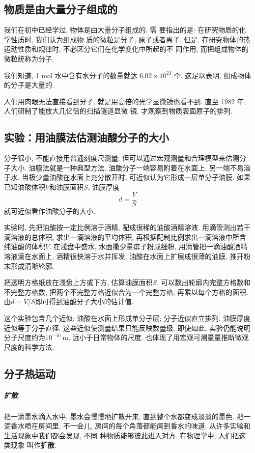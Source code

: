 \documentclass[11pt,a4paper]{ctexbook}
\newcommand{\unit}[1]{\ \mathrm{#1}}
\begin{document}
\subsection*{物质是由大量分子组成的}

我们在初中已经学过, 物体是由大量分子组成的. 需
要指出的是: 在研究物质的化学性质时, 我们认为组成物
质的微粒是分子, 原子或者离子. 但是, 在研究物体的热
运动性质和规律时, 不必区分它们在化学变化中所起的不
同作用, 而把组成物体的微粒统称为分子.

我们知道, 1 mol 水中含有水分子的数量就达 $6.02\times10^{23}$
个. 这足以表明, 组成物体的分子是大量的.

人们用肉眼无法直接看到分子, 就是用高倍的光学显微镜也看不到.
直至 1982 年, 人们研制了能放大几亿倍的扫描隧道显微
镜, 才观察到物质表面原子的排列.


\subsection*{实验：用油膜法估测油酸分子的大小}

分子很小, 不能直接用普通刻度尺测量. 但可以通过宏观测量和合理模型来估测分子大小.
油膜法就是一种典型方法. 油酸分子一端容易附着在水面上, 另一端不易溶于水. 当极少量油酸在水面上充分散开时,
可近似认为它形成一层单分子油膜. 如果已知油酸体积$V$和油膜面积$S$, 油膜厚度
$$d=\frac{V}{S}$$
就可近似看作油酸分子的大小.

实验时, 先把油酸按一定比例溶于酒精, 配成很稀的油酸酒精溶液. 用滴管测出若干滴溶液的总体积,
求出一滴溶液的平均体积, 再根据配制比例求出一滴溶液中所含纯油酸的体积$V$.
在浅盘中盛水, 水面撒少量痱子粉或细粉, 用滴管把一滴油酸酒精溶液滴在水面上. 酒精很快溶于水并挥发,
油酸在水面上扩展成很薄的油膜, 推开粉末形成清晰轮廓.

把透明方格纸放在浅盘上方或下方, 估算油膜面积$S$. 可以数出轮廓内完整方格数和不完整方格数,
把两个不完整方格近似合为一个完整方格, 再乘以每个方格的面积. 由$d=V/S$即可得到油酸分子大小的估计值.

这个实验包含几个近似: 油酸在水面上形成单分子层; 分子近似直立排列; 油膜厚度近似等于分子直径.
这些近似使测量结果只能反映数量级. 即使如此, 实验仍能说明分子尺度约为$10^{-10}\unit{m}$,
远小于日常物体的尺度, 也体现了用宏观可测量量推断微观尺度的科学方法.
\subsection*{分子热运动}

\subparagraph{扩散} 把一滴墨水滴入水中, 墨水会慢慢地扩散开来, 直到整个水都变成淡淡的墨色.
把一滴香水喷在房间里, 不一会儿, 房间的每个角落都能闻到香水的味道.
从许多实验和生活现象中我们都会发现, 不同
种物质能够彼此进入对方. 在物理学中, 人们把这类现象
叫作\textbf{扩散}.
\end{document}
